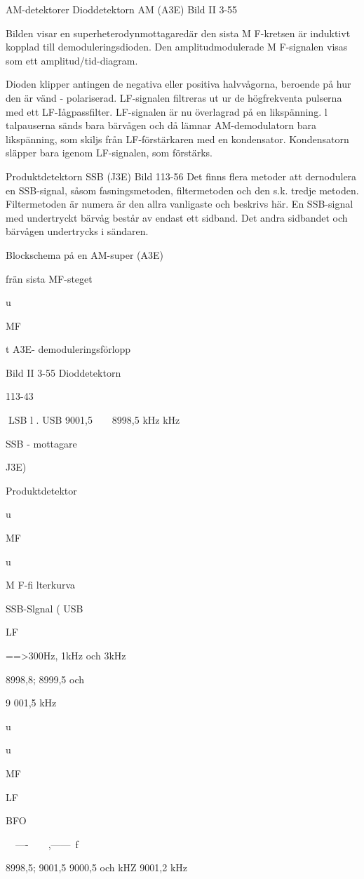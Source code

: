 \documentclass[a4paper,twoside,twocolumn,openright]{book}
\begin{document}
{{{{{{{AM-detektorer
Dioddetektorn AM (A3E)
Bild II 3-55

Bilden visar en superheterodynmottagaredär den sista M F-kretsen är induktivt kopplad till demoduleringsdioden. Den amplitudmodulerade M F-signalen visas som ett amplitud/tid-diagram.

Dioden klipper antingen de negativa eller
positiva halvvågorna, beroende på hur den
är vänd - polariserad.
LF-signalen filtreras ut ur de högfrekventa pulserna med ett LF-Iågpassfilter.
LF-signalen är nu överlagrad på en likspänning. l talpauserna sänds bara bärvågen och då lämnar AM-demodulatorn bara
likspänning, som skiljs från LF-förstärkaren
med en kondensator. Kondensatorn släpper
bara igenom LF-signalen, som förstärks.

Produktdetektorn SSB (J3E)
Bild 113-56
Det finns flera metoder att dernodulera en
SSB-signal, såsom fasningsmetoden, filtermetoden och den s.k. tredje metoden. Filtermetoden är numera är den allra vanligaste
och beskrivs här.
En SSB-signal med undertryckt bärvåg
består av endast ett sidband. Det andra
sidbandet och bärvågen undertrycks i sändaren.

Blockschema på en
AM-super (A3E)

frän sista MF-steget

u

MF

t
A3E- demoduleringsförlopp

Bild II 3-55 Dioddetektorn

113-43

LSB
l . USB
9001,5 ~ ~ 8998,5
kHz
kHz

SSB - mottagare {J3E)

Produktdetektor

u

MF

u

M F-fi lterkurva

SSB-Slgnal
( USB}

LF

==>300Hz, 1kHz och 3kHz

8998,8;
8999,5 och

9 001,5 kHz

u

u

MF

LF

BFO

~~----~~~~,------~f

8998,5;
9001,5
9000,5 och
kHZ
9001,2 kHz

}}}}}}}
\end{document}
